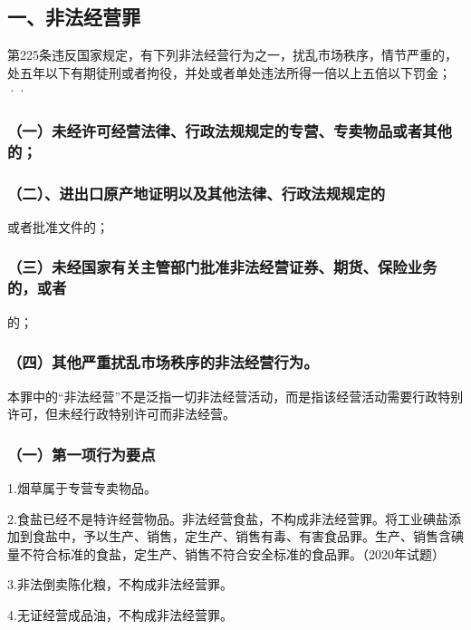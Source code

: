 \subsection*{一、非法经营罪}

第225条违反国家规定，有下列非法经营行为之一，扰乱市场秩序，情节严重的，处五年以下有期徒刑或者拘役，并处或者单处违法所得一倍以上五倍以下罚金；··

\subsubsection*{（一）未经许可经营法律、行政法规规定的专营、专卖物品或者其他的；}

\subsubsection*{（二）、进出口原产地证明以及其他法律、行政法规规定的}

或者批准文件的；

\subsubsection*{（三）未经国家有关主管部门批准非法经营证券、期货、保险业务的，或者}

的；

\subsubsection*{（四）其他严重扰乱市场秩序的非法经营行为。}

本罪中的“非法经营”不是泛指一切非法经营活动，而是指该经营活动需要行政特别许可，但未经行政特别许可而非法经营。

\subsubsection*{（一）第一项行为要点}

1.烟草属于专营专卖物品。

2.食盐已经不是特许经营物品。非法经营食盐，不构成非法经营罪。将工业碘盐添加到食盐中，予以生产、销售，定生产、销售有毒、有害食品罪。生产、销售含碘量不符合标准的食盐，定生产、销售不符合安全标准的食品罪。（2020年试题）

3.非法倒卖陈化粮，不构成非法经营罪。

4.无证经营成品油，不构成非法经营罪。

